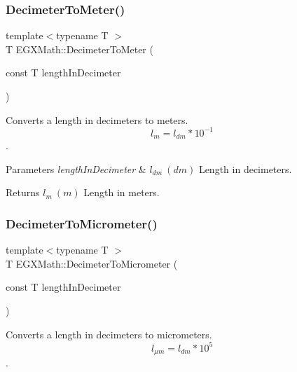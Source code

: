 \subsubsection{\texorpdfstring{Decimeter\+To\+Meter()}{DecimeterToMeter()}}
{\footnotesize\ttfamily template$<$typename T $>$ \\
T E\+G\+X\+Math\+::\+Decimeter\+To\+Meter (\begin{DoxyParamCaption}\item[{const T}]{length\+In\+Decimeter }\end{DoxyParamCaption})}



Converts a length in decimeters to meters. \[ l_{m}=l_{dm} * 10^{-1} \]. 


\begin{DoxyParams}{Parameters}
{\em length\+In\+Decimeter} & $ l_{dm}\ (dm)$ Length in decimeters. \\
\hline
\end{DoxyParams}
\begin{DoxyReturn}{Returns}
$ l_{m}\ (m)$ Length in meters. 
\end{DoxyReturn}
\mbox{\label{group___e_g_x_math-_conversions-_length_conversions-_decimeter-_s_i_ga5cf28083fa005b5a6a0dd6817c1633b7}} 
\subsubsection{\texorpdfstring{Decimeter\+To\+Micrometer()}{DecimeterToMicrometer()}}
{\footnotesize\ttfamily template$<$typename T $>$ \\
T E\+G\+X\+Math\+::\+Decimeter\+To\+Micrometer (\begin{DoxyParamCaption}\item[{const T}]{length\+In\+Decimeter }\end{DoxyParamCaption})}



Converts a length in decimeters to micrometers. \[ l_{\mu m}=l_{dm} * 10^{5} \]. 

